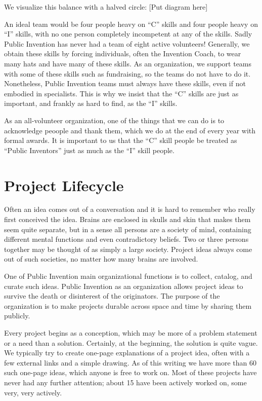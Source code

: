 \documentclass[
	fontsize=10pt, %
	twoside=false, %
	secnumdepth=1, %
]{kaobook}
\begin{document}
We visualize this balance with a halved circle:
[Put diagram here]

An ideal team would be four people heavy on ``C'' skills and four
people heavy on ``I'' skills, with no one person completely
incompetent at any of the skills. Sadly Public Invention has
never had a team of eight active volunteers! Generally, we obtain
these skills by forcing individuals, often the Invention Coach,
to wear many hats and have many of these skills.
As an organization, we support teams with some of these
skills such as fundraising, so the teams do not have to do it.
Nonetheless, Public Invention teams must always have these
skills, even if not embodied in specialists. This
is why we insist that the ``C'' skills are just as important,
and frankly as hard to find, as the ``I'' skills.

As an all-volunteer organization, one of the things that
we can do is to acknowledge peoople and thank them, which
we do at the end of every year with formal awards. It is important to us that
the ``C'' skill people be treated as ``Public Inventors'' just as
much as the ``I'' skill people.

\chapter{Project Lifecycle}

Often an idea comes out of a conversation and it is hard to remember who
really first conceived the idea. Brains are enclosed in skulls and skin that
makes them seem quite separate, but in a sense all persons are
a society of mind, containing different mental functions and even
contradictory beliefs. Two or three persons together may be
thought of as simply a large society.
Project ideas always come out of such societies,
no matter how many brains are involved.

One of Public Invention main organizational functions is to
collect, catalog, and curate such ideas.
Public Invention as an organization allows project ideas to survive
the death or disinterest of the originators.
The purpose of the organization is to make projects durable
across space and time by sharing them publicly.


Every project begins as a conception, which may be more of a
problem statement or a need than a solution. Certainly, at the
beginning, the solution is quite vague.
We typically try to create one-page explanations of a project
idea, often with a few external links and a simple drawing.
As of this writing we have more than 60 such one-page ideas,
which anyone is free to work on. Most of these projects
have never had any further attention; about 15 have been actively
worked on, some very, very actively.
\end{document}
